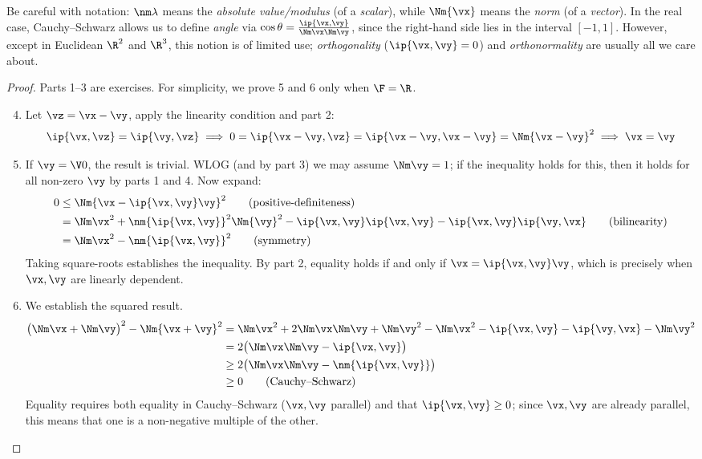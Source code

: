 Be careful with notation: $\nm\lambda$ means the \emph{absolute value/modulus} (of a \emph{scalar}), while $\Nm{\vx}$ means the \emph{norm} (of a \emph{vector}).\smallbreak
In the real case, Cauchy--Schwarz allows us to define \emph{angle} via $\cos\theta=\frac{\ip{\vx,\vy}}{\Nm\vx\Nm\vy}$, since the right-hand side lies in the interval $[-1,1]$. However, except in Euclidean $\R^2$ and $\R^3$, this notion is of limited use; \emph{orthogonality} ($\ip{\vx,\vy}=0$) and \emph{orthonormality} are usually all we care about.

\begin{proof}
Parts 1--3 are exercises. For simplicity, we prove 5 and 6 only when $\F=\R$.
\begin{enumerate}\setcounter{enumi}{3}
  \item Let $\vz=\vx-\vy$, apply the linearity condition and part 2:
  \[\ip{\vx,\vz}=\ip{\vy,\vz}\implies 0=\ip{\vx-\vy,\vz}=\ip{\vx-\vy,\vx-\vy}=\Nm{\vx-\vy}^2\implies \vx=\vy\]
  \item If $\vy=\V0$, the result is trivial. WLOG (and by part 3) we may assume $\Nm\vy=1$; if the inequality holds for this, then it holds for all non-zero $\vy$ by parts 1 and 4. Now expand:
  \begin{align*}
  0&\le\Nm{\vx-\ip{\vx,\vy}\vy}^2\tag{positive-definiteness}\\
  &=\Nm\vx^2+\nm{\ip{\vx,\vy}}^2\Nm{\vy}^2 -\ip{\vx,\vy}\ip{\vx,\vy} -\ip{\vx,\vy}\ip{\vy,\vx} \tag{bilinearity}\\
  &=\Nm\vx^2-\nm{\ip{\vx,\vy}}^2\tag{symmetry}
  \end{align*}
  Taking square-roots establishes the inequality.\smallbreak
  By part 2, equality holds if and only if $\vx=\ip{\vx,\vy}\vy$, which is precisely when $\vx,\vy$ are linearly dependent.
  \item We establish the squared result.
  \begin{align*}
  \bigl(\Nm\vx+\Nm\vy\bigr)^2-\Nm{\vx+\vy}^2&=\Nm\vx^2+2\Nm\vx\Nm\vy+\Nm\vy^2-\Nm\vx^2-\ip{\vx,\vy}-\ip{\vy,\vx}-\Nm\vy^2\\
  &=2\bigl(\Nm\vx\Nm\vy-\ip{\vx,\vy}\bigr)\\
  &\ge 2\bigl(\Nm\vx\Nm\vy-\nm{\ip{\vx,\vy}}\bigr)\\
  &\ge 0 \tag{Cauchy--Schwarz}
  \end{align*}
  Equality requires both equality in Cauchy--Schwarz ($\vx,\vy$ parallel) and that $\ip{\vx,\vy}\ge 0$; since $\vx,\vy$ are already parallel, this means that one is a non-negative multiple of the other.\qedhere
\end{enumerate}
\end{proof}

